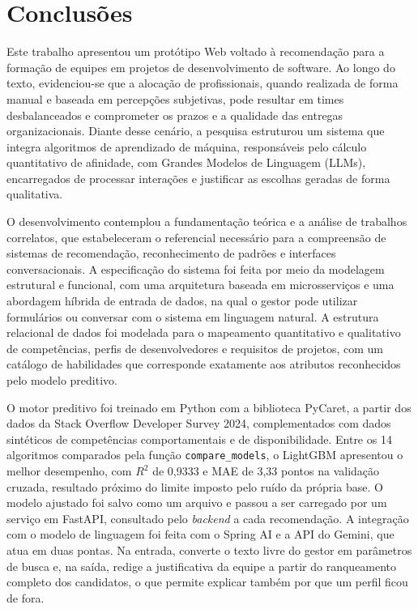 \section{Conclusões}

Este trabalho apresentou um protótipo Web voltado à recomendação para a formação de equipes em projetos de desenvolvimento de software. Ao longo do texto, evidenciou-se que a alocação de profissionais, quando realizada de forma manual e baseada em percepções subjetivas, pode resultar em times desbalanceados e comprometer os prazos e a qualidade das entregas organizacionais. Diante desse cenário, a pesquisa estruturou um sistema que integra algoritmos de aprendizado de máquina, responsáveis pelo cálculo quantitativo de afinidade, com Grandes Modelos de Linguagem (LLMs), encarregados de processar interações e justificar as escolhas geradas de forma qualitativa.

O desenvolvimento contemplou a fundamentação teórica e a análise de trabalhos correlatos, que estabeleceram o referencial necessário para a compreensão de sistemas de recomendação, reconhecimento de padrões e interfaces conversacionais. A especificação do sistema foi feita por meio da modelagem estrutural e funcional, com uma arquitetura baseada em microsserviços e uma abordagem híbrida de entrada de dados, na qual o gestor pode utilizar formulários ou conversar com o sistema em linguagem natural. A estrutura relacional de dados foi modelada para o mapeamento quantitativo e qualitativo de competências, perfis de desenvolvedores e requisitos de projetos, com um catálogo de habilidades que corresponde exatamente aos atributos reconhecidos pelo modelo preditivo.

O motor preditivo foi treinado em Python com a biblioteca PyCaret, a partir dos dados da Stack Overflow Developer Survey 2024, complementados com dados sintéticos de competências comportamentais e de disponibilidade. Entre os 14 algoritmos comparados pela função \texttt{compare\_models}, o LightGBM apresentou o melhor desempenho, com $R^2$ de 0,9333 e MAE de 3,33 pontos na validação cruzada, resultado próximo do limite imposto pelo ruído da própria base. O modelo ajustado foi salvo como um arquivo e passou a ser carregado por um serviço em FastAPI, consultado pelo \textit{backend} a cada recomendação. A integração com o modelo de linguagem foi feita com o Spring AI e a API do Gemini, que atua em duas pontas. Na entrada, converte o texto livre do gestor em parâmetros de busca e, na saída, redige a justificativa da equipe a partir do ranqueamento completo dos candidatos, o que permite explicar também por que um perfil ficou de fora.

